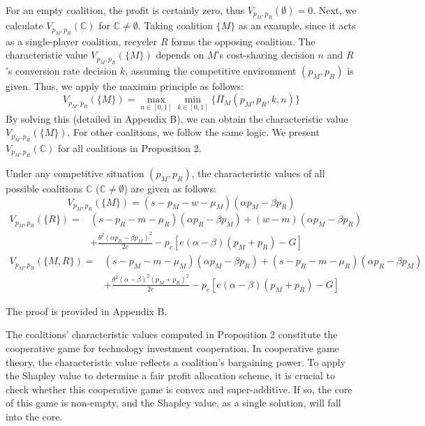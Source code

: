 \documentclass[authoryear,preprint,review,times,10pt]{elsarticle}
\begin{document}
For an empty coalition, the profit is certainly zero, thus $V_{p_M,p_R}(\emptyset) = 0$. Next, we calculate $V_{p_M,p_R}(\mathbb{C})$ for $\mathbb{C} \neq \emptyset$. Taking coalition $\{M\}$ as an example, since it acts as a single-player coalition, recycler $R$ forms the opposing coalition. The characteristic value $V_{p_M,p_R}(\{M\})$ depends on $M$'s cost-sharing decision $n$ and $R$'s conversion rate decision $k$, assuming the competitive environment $(p_M, p_R)$ is given. Thus, we apply the maximin principle as follows:
\begin{equation}
V_{p_M,p_R}(\{M\}) = \max_{n \in [0,1]} \min_{k \in [0,1]} \{\Pi_M(p_M, p_R, k, n)\}
\end{equation}
By solving this (detailed in Appendix B), we can obtain the characteristic value $V_{p_M,p_R}(\{M\})$. For other coalitions, we follow the same logic. We present $V_{p_M,p_R}(\mathbb{C})$ for all coalitions in Proposition 2.

\begin{prop}
\label{prop:characteristic}
Under any competitive situation $(p_M, p_R)$, the characteristic values of all possible coalitions $\mathbb{C}$ ($\mathbb{C} \neq \emptyset$) are given as follows:
\begin{equation}
V_{p_M,p_R}(\{M\}) = (s - p_M - w - \mu_M)(\alpha p_M - \beta p_R)
\end{equation}
\begin{equation}
\begin{aligned}
V_{p_M,p_R}(\{R\}) =& (s - p_R - m - \mu_R)(\alpha p_R - \beta p_M) + (w - m)(\alpha p_M - \beta p_R) \\
&+ \frac{\theta^2(\alpha p_R - \beta p_M)^2}{2c} - p_c[e(\alpha - \beta)(p_M + p_R) - G]
\end{aligned}
\end{equation}
\begin{equation}
\begin{aligned}
V_{p_M,p_R}(\{M,R\}) =& (s - p_M - m - \mu_M)(\alpha p_M - \beta p_R) + (s - p_R - m - \mu_R)(\alpha p_R - \beta p_M) \\
&+ \frac{\theta^2(\alpha - \beta)^2(p_M + p_R)^2}{2c} - p_c[e(\alpha - \beta)(p_M + p_R) - G]
\end{aligned}
\end{equation}
\end{prop}

 The proof is provided in Appendix B.

The coalitions' characteristic values computed in Proposition 2 constitute the cooperative game for technology investment cooperation. In cooperative game theory, the characteristic value reflects a coalition's bargaining power. To apply the Shapley value to determine a fair profit allocation scheme, it is crucial to check whether this cooperative game is convex and super-additive. If so, the core of this game is non-empty, and the Shapley value, as a single solution, will fall into the core.
\end{document}
